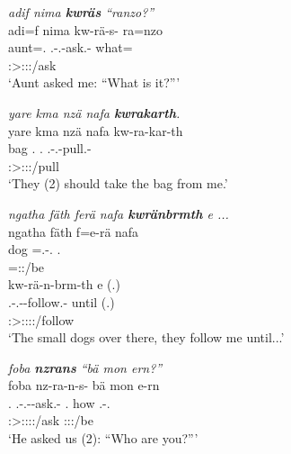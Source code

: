 \begin{exe}
	\ex \emph{adif nima \textbf{kwräs} ``ranzo?''}\\
	\glll adi=f nima kw-rä-s-\Zero{} ra=nzo\\
	aunt=\Erg.\Sg{} \Quot{} \Fsg.\Bet-\Irr.\Ndu-ask.\Rs-\Stsg{} what=\Only\\
	{} {} \footnotesize{\Stsg:\Sbj>\Fsg:\Obj:\Irr:\Pfv/ask} {}\\
	\trans `Aunt asked me: ``What is it?''' 
	\label{ex243}
\end{exe}
\begin{exe}
	\ex \emph{yare kma nzä nafa \textbf{kwrakarth}.}\\
	\glll yare kma nzä nafa kw-ra-kar-th\\
	bag \Pot{} \Fsg.\Abs{} \Tnsg.\Erg{} \Fsg.\Bet-\Irr.\Du-pull.\Rs-\Stnsg\\
	{} {} {} {} \footnotesize{\Stdu:\Sbj>\Fsg:\Obj:\Irr:\Pfv/pull}\\
	\trans `They (2) should take the bag from me.' 
	\label{ex245}
\end{exe}
\begin{exe}
	\ex \emph{ngatha fäth ferä nafa \textbf{kwränbrmth} e ...}\\
	\glll ngatha fäth f=e-rä nafa\\
	dog \Dim{} \Dist=\Stnsg.\Alph-\Cop.\Ndu{} \Tnsg.\Erg{}\\
	{} {} \footnotesize{\Dist=\Stpl:\Sbj:\Nonpast/be} {}\\
	\sn
	\glll kw-rä-n-brm-th e (.)\\
	\Fsg{}.\Bet{}-\Irr.\Ndu-\Venit-follow.\Rs-\Stnsg{} until (.)\\
	\footnotesize{\Stpl:\Sbj>\Fsg:\Obj:\Irr:\Pfv:\Venit/follow} {} {}\\
	\trans `The small dogs over there, they follow me until...' 
	\label{ex246}
\end{exe}
\begin{exe}
	\ex \emph{foba \textbf{nzrans} ``bä mon ern?''}\\
	\glll foba nz-ra-n-s-\Zero{} bä mon e-rn\\
	\Dist.\Abl{} \Fnsg.\Bet-\Irr.\Du-\Venit-ask.\Rs-\Stsg{} \Second.\Abs{} how \Stnsg.\Alph-\Cop.\Du\\
	{} \footnotesize{\Stsg:\Sbj>\Fdu:\Obj:\Irr:\Pfv:\Venit/ask} {} {} \footnotesize{\Stdu:\Sbj:\Nonpast:\Ipfv/be}\\
	\trans `He asked us (2): ``Who are you?''' 
	\label{ex248}
\end{exe}

